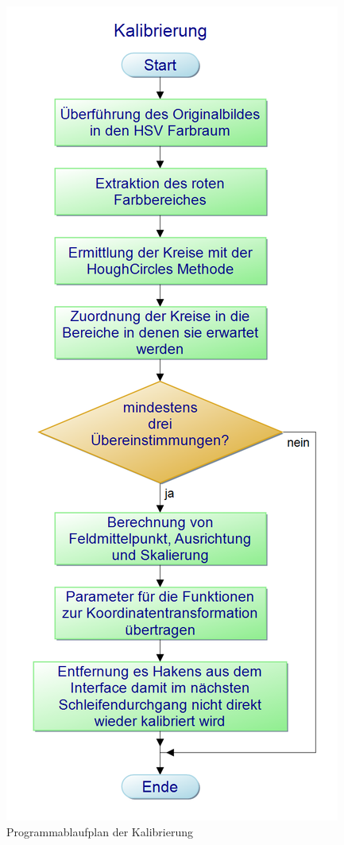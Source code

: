 \begin{figure} [h]
\begin{minipage}[t]{0.3\textwidth}
\includegraphics[scale =0.3]{images/kalibrierung_pap}
 \caption{Programmablaufplan der Kalibrierung}
 \label{kalib_pap}
\end{minipage}
\end{figure}

